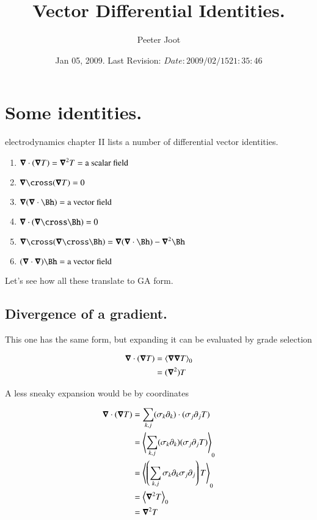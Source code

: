 \documentclass{article}
\title{ Vector Differential Identities. }
\author{Peeter Joot}
\date{ Jan 05, 2009.  Last Revision: $Date: 2009/02/15 21:35:46 $ }
\begin{document}
\maketitle{}
\section{ Some identities. }

\cite{feynman1963flp} electrodynamics chapter II lists a number of
differential vector identities.

\begin{enumerate}
\item $\boldsymbol{\nabla} \cdot (\boldsymbol{\nabla} T) = \boldsymbol{\nabla}^2 T = \mbox{a scalar field}$
\item $\spacegrad \cross (\spacegrad T) = 0$
\item $\spacegrad (\spacegrad \cdot \Bh) = \mbox{a vector field}$
\item $\spacegrad \cdot (\spacegrad \cross \Bh) = 0$
\item $\spacegrad \cross (\spacegrad \cross \Bh) = \spacegrad(\spacegrad \cdot \Bh) - \spacegrad^2 \Bh$
\item $(\spacegrad \cdot \spacegrad) \Bh = \mbox{a vector field}$
\end{enumerate}

Let's see how all these translate to GA form.

\subsection{ Divergence of a gradient. }

This one has the same form, but expanding it can be evaluated by grade
selection

\begin{align*}
\boldsymbol{\nabla} \cdot (\boldsymbol{\nabla} T) 
&= {\left\langle{{\boldsymbol{\nabla}\boldsymbol{\nabla}T}}\right\rangle}_{0} \\
&= (\boldsymbol{\nabla}^2) T
\end{align*}

A less sneaky expansion would be by coordinates

\begin{align*}
\boldsymbol{\nabla} \cdot (\boldsymbol{\nabla} T) 
&= {\sum_{k,j} (\sigma_k \partial_k) \cdot (\sigma_j \partial_j T)} \\
&= {\left\langle{{\sum_{k,j} (\sigma_k \partial_k) (\sigma_j \partial_j T)}}\right\rangle}_{0} \\
&= {\left\langle{{\left(\sum_{k,j} \sigma_k \partial_k \sigma_j \partial_j\right) T}}\right\rangle}_{0} \\
&= {\left\langle{{\boldsymbol{\nabla}^2 T}}\right\rangle}_{0} \\
&= \boldsymbol{\nabla}^2 T \\
\end{align*}
\end{document}
